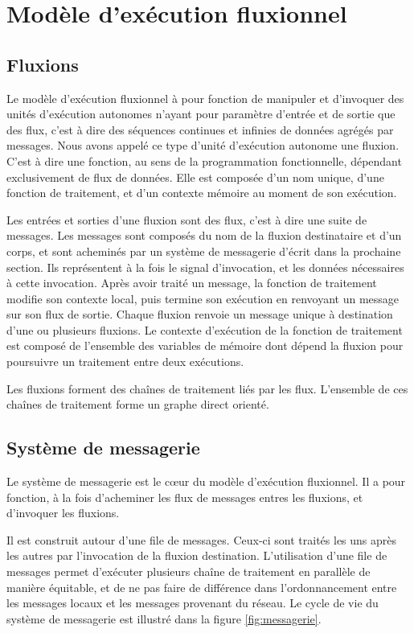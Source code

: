 \section{Modèle d'exécution fluxionnel}

\subsection{Fluxions}

Le modèle d'exécution fluxionnel à pour fonction de manipuler et d'invoquer des unités d'exécution autonomes n'ayant pour paramètre d'entrée et de sortie que des flux, c'est à dire des séquences continues et infinies de données agrégés par messages.
Nous avons appelé ce type d'unité d'exécution autonome une fluxion.
C'est à dire une fonction, au sens de la programmation fonctionnelle, dépendant exclusivement de flux de données.
Elle est composée d'un nom unique, d'une fonction de traitement, et d'un contexte mémoire au moment de son exécution.

Les entrées et sorties d'une fluxion sont des flux, c'est à dire une suite de messages.
Les messages sont composés du nom de la fluxion destinataire et d'un corps, et sont acheminés par un système de messagerie d'écrit dans la prochaine section.
Ils représentent à la fois le signal d'invocation, et les données nécessaires à cette invocation.
Après avoir traité un message, la fonction de traitement modifie son contexte local, puis termine son exécution en renvoyant un message sur son flux de sortie.
Chaque fluxion renvoie un message unique à destination d'une ou plusieurs fluxions.
Le contexte d'exécution de la fonction de traitement est composé de l'ensemble des variables de mémoire dont dépend la fluxion pour poursuivre un traitement entre deux exécutions.

Les fluxions forment des chaînes de traitement liés par les flux.
L'ensemble de ces chaînes de traitement forme un graphe direct orienté.

\subsection{Système de messagerie}

Le système de messagerie est le cœur du modèle d'exécution fluxionnel.
Il a pour fonction, à la fois d'acheminer les flux de messages entres les fluxions, et d'invoquer les fluxions.

Il est construit autour d'une file de messages.
Ceux-ci sont traités les uns après les autres par l'invocation de la fluxion destination.
L'utilisation d'une file de messages permet d'exécuter plusieurs chaîne de traitement en parallèle de manière équitable, et de ne pas faire de différence dans l'ordonnancement entre les messages locaux et les messages provenant du réseau.
Le cycle de vie du système de messagerie est illustré dans la figure \ref{fig:messagerie}.


